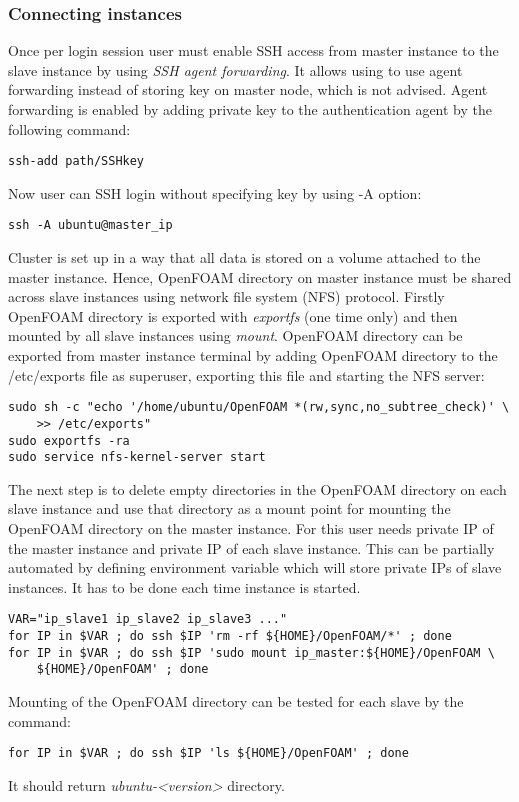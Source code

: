 \documentclass[11pt,english]{article}
\begin{document}
\subsubsection{Connecting instances}
Once per login session user must enable SSH access from master instance to the slave instance by using \textit{SSH agent forwarding}. It allows using to use agent forwarding instead of storing key on master node, which is not advised. Agent forwarding is enabled by adding private key to the authentication agent by the following command:
\begin{lstlisting}
ssh-add path/SSHkey
\end{lstlisting}
Now user can SSH login without specifying key by using -A option:
\begin{lstlisting}
ssh -A ubuntu@master_ip
\end{lstlisting}
Cluster is set up in a way that all data is stored on a volume attached to the master instance. Hence, OpenFOAM directory on master instance must be shared across slave instances using network file system (NFS) protocol. Firstly OpenFOAM directory is exported with \textit{exportfs} (one time only) and then mounted by all slave instances using \textit{mount}.
OpenFOAM directory can be exported from master instance terminal by adding OpenFOAM directory to the /etc/exports file as superuser, exporting this file and starting the NFS server:
\begin{lstlisting}
sudo sh -c "echo '/home/ubuntu/OpenFOAM *(rw,sync,no_subtree_check)' \
	>> /etc/exports"
sudo exportfs -ra
sudo service nfs-kernel-server start
\end{lstlisting}
The next step is to delete empty directories in the OpenFOAM directory on each slave instance and use that directory as a mount point for mounting the OpenFOAM directory on the master instance. For this user needs private IP of the master instance and private IP of each slave instance. This can be partially automated by defining environment variable which will store private IPs of slave instances. It has to be done each time instance is started.
\begin{lstlisting}
VAR="ip_slave1 ip_slave2 ip_slave3 ..."
for IP in $VAR ; do ssh $IP 'rm -rf ${HOME}/OpenFOAM/*' ; done
for IP in $VAR ; do ssh $IP 'sudo mount ip_master:${HOME}/OpenFOAM \
	${HOME}/OpenFOAM' ; done
\end{lstlisting}
Mounting of the OpenFOAM directory can be tested for each slave by the command:
\begin{lstlisting}
for IP in $VAR ; do ssh $IP 'ls ${HOME}/OpenFOAM' ; done
\end{lstlisting}
It should return \textit{ubuntu-<version>} directory.
\end{document}

